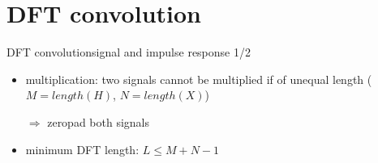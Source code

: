 \section[DFT]{DFT convolution}
	\begin{frame}{DFT convolution}{signal and impulse response 1/2}
		\begin{itemize}
			\item	multiplication: two signals cannot be multiplied if of unequal length ($M = length(H)$, $N = length(X)$)
            \item[$\Rightarrow$] zeropad both signals
			\item	minimum DFT length: $L \leq M+N-1$
		\end{itemize}
		\vspace{50mm}
	\end{frame}

